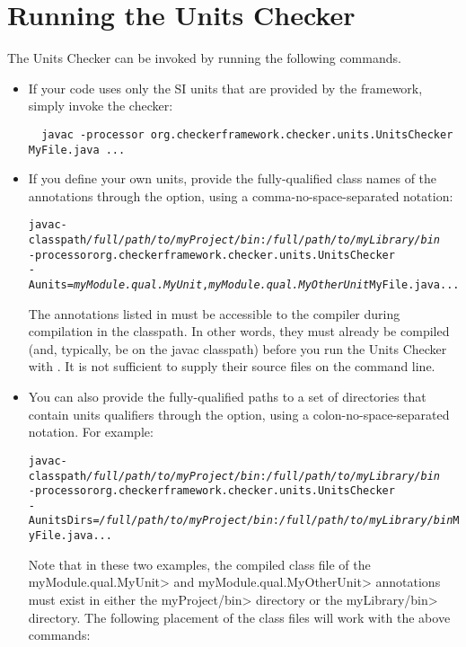 \section{Running the Units Checker\label{units-running}}

The Units Checker can be invoked by running the following commands.

\begin{itemize}
\item
If your code uses only the SI units that are provided by the
framework, simply invoke the checker:

\begin{Verbatim}
  javac -processor org.checkerframework.checker.units.UnitsChecker MyFile.java ...
\end{Verbatim}

\item
If you define your own units, provide the fully-qualified class names of the
annotations through the  option, using a comma-no-space-separated
notation:

\begin{alltt}
  javac -classpath \textit{/full/path/to/myProject/bin}:\textit{/full/path/to/myLibrary/bin} \ttbs
        -processor org.checkerframework.checker.units.UnitsChecker \ttbs
        -Aunits=\textit{myModule.qual.MyUnit},\textit{myModule.qual.MyOtherUnit} MyFile.java ...
\end{alltt}

The annotations listed in  must be accessible to
the compiler during compilation in the classpath.  In other words, they must
already be compiled (and, typically, be on the javac classpath)
before you run the Units Checker with .  It
is not sufficient to supply their source files on the command line.

\item
You can also provide the fully-qualified paths to a set of directories
that contain units qualifiers through the  option,
using a colon-no-space-separated notation. For example:

\begin{alltt}
  javac -classpath \textit{/full/path/to/myProject/bin}:\textit{/full/path/to/myLibrary/bin} \ttbs
        -processor org.checkerframework.checker.units.UnitsChecker \ttbs
        -AunitsDirs=\textit{/full/path/to/myProject/bin}:\textit{/full/path/to/myLibrary/bin} MyFile.java ...
\end{alltt}

Note that in these two examples, the compiled class file of the
\<myModule.qual.MyUnit> and \<myModule.qual.MyOtherUnit> annotations
must exist in either the \<myProject/bin> directory or the
\<myLibrary/bin> directory. The following placement of the class files
will work with the above commands:


\end{itemize}
